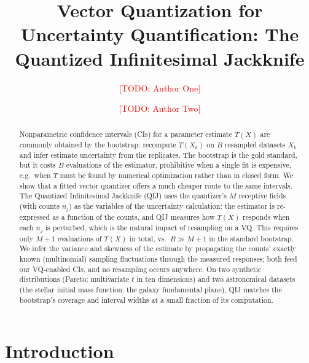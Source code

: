 \documentclass[runningheads]{llncs}
\newcommand{\todo}[1]{\textcolor{red}{[TODO: #1]}}
\begin{document}
\title{Vector Quantization for Uncertainty Quantification: The Quantized Infinitesimal Jackknife}

\author{\todo{Author One}\orcidID{\todo{0000-0000-0000-0000}} \and
\todo{Author Two}}
\authorrunning{\todo{A. One and A. Two}}
\institute{\todo{Institute One, City, Country}
\email{\todo{email@example.edu}}
\and
\todo{Institute Two, City, Country}}

\maketitle

\begin{abstract}
Nonparametric confidence intervals (CIs) for a parameter estimate $T(X)$ are commonly obtained by the bootstrap: recompute $T(X_b)$ on $B$ resampled datasets $X_b$ and infer estimate uncertainty from the replicates. The bootstrap is the gold standard, but it costs $B$ evaluations of the estimator, prohibitive when a single fit is expensive, e.g.\ when $T$ must be found by numerical optimization rather than in closed form. We show that a fitted vector quantizer offers a much cheaper route to the same intervals. The Quantized Infinitesimal Jackknife (QIJ) uses the quantizer's $M$ receptive fields (with counts $n_j$) as the variables of the uncertainty calculation: the estimator is re-expressed as a function of the counts, and QIJ measures how $T(X)$ responds when each $n_j$ is perturbed, which is the natural impact of resampling on a VQ. This requires only $M{+}1$ evaluations of $T(X)$ in total, vs.\ $B \gg M{+}1$ in the standard bootstrap. We infer the variance and skewness of the estimate by propagating the counts' exactly known (multinomial) sampling fluctuations through the measured responses; both feed our VQ-enabled CIs, and no resampling occurs anywhere. On two synthetic distributions (Pareto; multivariate $t$ in ten dimensions) and two astronomical datasets (the stellar initial mass function; the galaxy fundamental plane), QIJ matches the bootstrap's coverage and interval widths at a small fraction of its computation.
\end{abstract}


\section{Introduction}\label{sec:intro}
\end{document}
